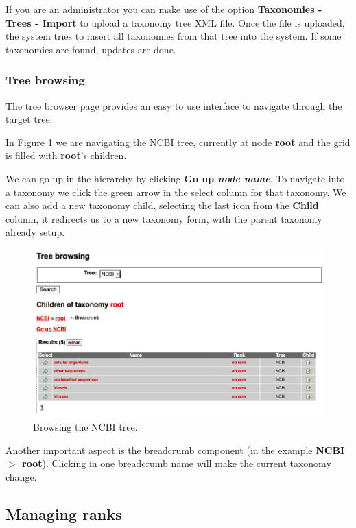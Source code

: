 If you are an administrator you can make use of the option \textbf{Taxonomies - Trees - Import}
to upload a taxonomy tree XML file. Once the file is uploaded, the system tries to insert
all taxonomies from that tree into the system. If some taxonomies are found, updates are done.

\subsubsection{Tree browsing}

The tree browser page provides an easy to use interface to navigate through the target tree.

In Figure \ref{fig:tree_browsing} we are navigating the NCBI tree, currently at node \textbf{root}
and the grid is filled with \textbf{root}'s children.

We can go up in the hierarchy by clicking \textbf{Go up \textit{node name}}. To navigate into
a taxonomy we click the green arrow in the select column for that taxonomy. We can also
add a new taxonomy child, selecting the last icon from the \textbf{Child} column, it redirects us
to a new taxonomy form, with the parent taxonomy already setup.

\begin{figure}[H]
  \centering
    \includegraphics[scale=0.4]{tree_browsing.png}
  \caption{Browsing the NCBI tree.}
  \label{fig:tree_browsing}
\end{figure}

Another important aspect is the breadcrumb component (in the example \textbf{NCBI $>$ root}). Clicking
in one breadcrumb name will make the current taxonomy change.

\subsection{Managing ranks}

